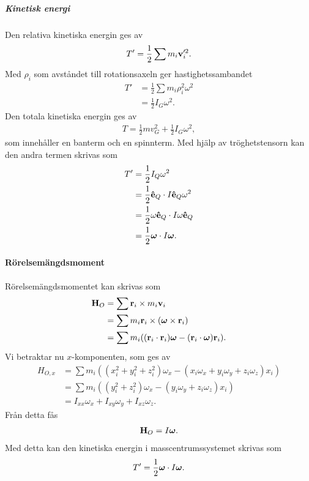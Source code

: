 \subparagraph{Kinetisk energi}
Den relativa kinetiska energin ges av
\begin{align*}
	T' = \frac{1}{2}\sum m_{i}\vb{v}_{i}'^{2}.
\end{align*}
Med $\rho_{i}$ som avståndet till rotationsaxeln ger hastighetssambandet
\begin{align*}
	T' &= \frac{1}{2}\sum m_{i}\rho_{i}^{2}\omega^{2} \\
	   &= \frac{1}{2}I_{G}\omega^{2}.
\end{align*}
Den totala kinetiska energin ges av
\begin{align*}
	T = \frac{1}{2}mv_{G}^{2} + \frac{1}{2}I_{G}\omega^{2},
\end{align*}
som innehåller en banterm och en spinnterm. Med hjälp av tröghetstensorn kan den andra termen skrivas som
\begin{align*}
	T' &= \frac{1}{2}I_{Q}\omega^2 \\
	   &= \frac{1}{2}\vu{e}_{Q}\cdot I\vu{e}_{Q}\omega^2 \\
	   &= \frac{1}{2}\omega\vu{e}_{Q}\cdot I\omega\vu{e}_{Q} \\
	   &= \frac{1}{2}\vb*{\omega}\cdot I\vb*{\omega}.
\end{align*}

\paragraph{Rörelsemängdsmoment}
Rörelsemängdsmomentet kan skrivas som
\begin{align*}
	\vb{H}_{O} &= \sum \vb{r}_{i}\times m_{i}\vb{v}_{i} \\
	           &= \sum m_{i}\vb{r}_{i}\times(\vb*{\omega}\times\vb{r}_{i}) \\
	           &= \sum m_{i}((\vb{r}_{i}\cdot\vb{r}_{i})\vb*{\omega} - (\vb{r}_{i}\cdot\vb*{\omega})\vb{r}_{i}).
\end{align*}
Vi betraktar nu $x$-komponenten, som ges av
\begin{align*}
	H_{O, x} &= \sum m_{i}((x_{i}^2 + y_{i}^2 + z_{i}^2)\omega_{x} - (x_{i}\omega_{x} + y_{i}\omega_{y} + z_{i}\omega_{z})x_{i}) \\
	         &= \sum m_{i}((y_{i}^2 + z_{i}^2)\omega_{x} - (y_{i}\omega_{y} + z_{i}\omega_{z})x_{i}) \\
	         &= I_{xx}\omega_{x} + I_{xy}\omega_{y} + I_{xz}\omega_{z}.
\end{align*}
Från detta fås
\begin{align*}
	\vb{H}_{O} = I\vb*{\omega}.
\end{align*}
Med detta kan den kinetiska energin i masscentrumssystemet skrivas som
\begin{align*}
	T' = \frac{1}{2}\vb*{\omega}\cdot I\vb*{\omega}.
\end{align*}

